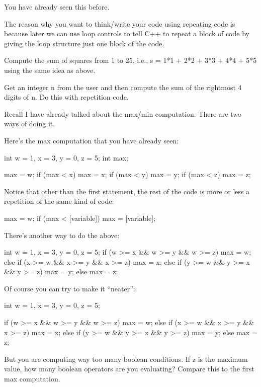 You have already seen this before.

The reason why you want to think/write your code using repeating code is
because later we can use loop controls to tell C++ to repeat a block of
code by giving the loop structure just one block of the code.

\begin{ex}
Compute the sum of squares from 1 to 25, i.e., s =
1*1 + 2*2 + 3*3 + 4*4 + 5*5 using the same idea as above.
\end{ex}
\begin{ex}
Get an integer n from the user and then compute the
sum of the rightmost 4 digits of n. Do this with repetition code.
\end{ex}
\newpage{}

Recall I have already talked about the max/min computation. There are
two ways of doing it.

Here's the max computation that you have already seen:
\begin{console}
int w = 1, x = 3, y = 0, z = 5;
int max;

max = w;
if (max < x)
   max = x;
if (max < y)
   max = y;
if (max < z)
   max = z; 
\end{console}

Notice that other than the first statement, the rest of the code is more
or less a repetition of the same kind of code:
\begin{console}
max = w;
if (max < [variable])
   max = [variable]; 
\end{console}

There's another  way to do the above:
\begin{consolethree}
int w = 1, x = 3, y = 0, z = 5;
if (w >= x && w >= y && w >= z)
    max = w;
else
{
     if (x >= w && x >= y && x >= z)
         max = x;
     else
     {
        if (y >= w && y >= x && y >= z)
            max = y;
        else
            max = z;
      }
}
\end{consolethree}

Of course you can try to make it ``neater'':
\begin{console}
int w = 1, x = 3, y = 0, z = 5;

if (w >= x && w >= y && w >= z)
    max = w;
else if (x >= w && x >= y && x >= z)
    max = x;
else if (y >= w && y >= x && y >= z)
    max = y;
else
    max = z;
\end{console}

But you are computing way too many boolean conditions. If z is the
maximum value, how many boolean operators are you evaluating? Compare
this to the first max computation.

